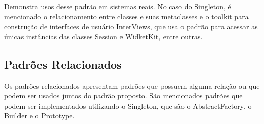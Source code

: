 Demonstra usos desse padrão em sistemas reais. No caso 
do Singleton, é mencionado o relacionamento entre 
classes e suas metaclasses e o toolkit para construção 
de interfaces de usuário InterViews, que usa o padrão para 
acessar as únicas instâncias das classes Session e 
WidketKit, entre outras.

\subsection*{Padrões Relacionados}

Os padrões relacionados apresentam padrões que 
possuem alguma relação ou que podem ser usados juntos 
do padrão proposto. São mencionados padrões que 
podem ser implementados utilizando o Singleton, que 
são o AbstractFactory, o Builder e o Prototype.

